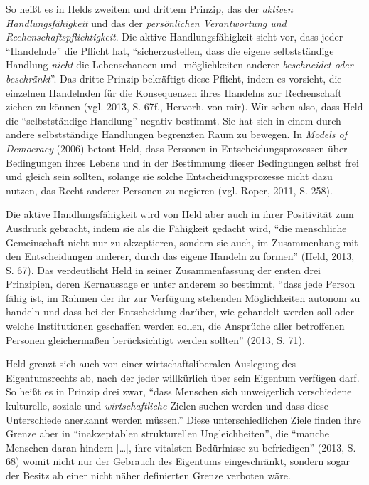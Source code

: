 \documentclass[ngerman,12pt, titlepage, smallheadings, nomath]{scrartcl}
\begin{document}
So heißt es in Helds zweitem und drittem Prinzip, das der \emph{aktiven
Handlungsfähigkeit} und das der \emph{persönlichen Verantwortung und
Rechenschaftspflichtigkeit}. Die aktive Handlungsfähigkeit sieht vor,
dass jeder \enquote{Handelnde} die Pflicht hat,
\enquote{sicherzustellen, dass die eigene selbstständige Handlung
\emph{nicht} die Lebenschancen und -möglichkeiten anderer
\emph{beschneidet oder beschränkt}}. Das dritte Prinzip bekräftigt diese
Pflicht, indem es vorsieht, die einzelnen Handelnden für die
Konsequenzen ihres Handelns zur Rechenschaft ziehen zu können (vgl.
2013, S. 67f., Hervorh. von mir). Wir sehen also, dass Held die
\enquote{selbstständige Handlung} negativ bestimmt. Sie hat sich in
einem durch andere selbstständige Handlungen begrenzten Raum zu bewegen.
In \emph{Models of Democracy} (2006) betont Held, dass Personen in
Entscheidungsprozessen über Bedingungen ihres Lebens und in der
Bestimmung dieser Bedingungen selbst frei und gleich sein sollten,
solange sie solche Entscheidungsprozesse nicht dazu nutzen, das Recht
anderer Personen zu negieren (vgl. Roper, 2011, S. 258).

Die aktive Handlungsfähigkeit wird von Held aber auch in ihrer
Positivität zum Ausdruck gebracht, indem sie als die Fähigkeit gedacht
wird, \enquote{die menschliche Gemeinschaft nicht nur zu akzeptieren,
sondern sie auch, im Zusammenhang mit den Entscheidungen anderer, durch
das eigene Handeln zu formen} (Held, 2013, S. 67). Das verdeutlicht Held
in seiner Zusammenfassung der ersten drei Prinzipien, deren Kernaussage
er unter anderem so bestimmt, \enquote{dass jede Person fähig ist, im
Rahmen der ihr zur Verfügung stehenden Möglichkeiten autonom zu handeln
und dass bei der Entscheidung darüber, wie gehandelt werden soll oder
welche Institutionen geschaffen werden sollen, die Ansprüche aller
betroffenen Personen gleichermaßen berücksichtigt werden sollten} (2013,
S. 71).

Held grenzt sich auch von einer wirtschaftsliberalen Auslegung des
Eigentumsrechts ab, nach der jeder willkürlich über sein Eigentum
verfügen darf. So heißt es in Prinzip drei zwar, \enquote{dass Menschen
sich unweigerlich verschiedene kulturelle, soziale und
\emph{wirtschaftliche} Zielen suchen werden und dass diese Unterschiede
anerkannt werden müssen.} Diese unterschiedlichen Ziele finden ihre
Grenze aber in \enquote{inakzeptablen strukturellen Ungleichheiten}, die
\enquote{manche Menschen daran hindern {[}\ldots{}{]}, ihre vitalsten
Bedürfnisse zu befriedigen} (2013, S. 68) womit nicht nur der Gebrauch
des Eigentums eingeschränkt, sondern sogar der Besitz ab einer nicht
näher definierten Grenze verboten wäre.
\end{document}
